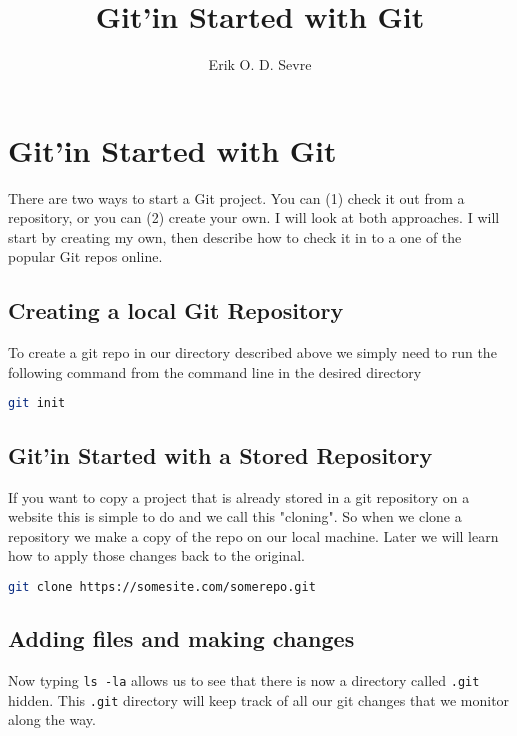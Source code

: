 \documentclass[a4paper]{spie} %
\author{Erik O. D. Sevre}
\title{Git'in Started with Git}
\begin{document}
\maketitle

\section*{Git'in Started with Git}

There are two ways to start a Git project. You can (1) check it out from a repository, or you can (2) create your own. I will look at both approaches. I will start by creating my own, then describe how to check it in to a one of the popular Git repos online.

\subsection*{Creating a local Git Repository}

To create a git repo in our directory described above we simply need to run the following command from the command line in the desired directory
\begin{lstlisting}[language=bash]
git init
\end{lstlisting}

\subsection*{Git'in Started with a Stored Repository}

If you want to copy a project that is already stored in a git repository on a website this is simple to do and we call this "cloning". So when we clone a repository we make a copy of the repo on our local machine. Later we will learn how to apply those changes back to the original.

\begin{lstlisting}[language=bash]
git clone https://somesite.com/somerepo.git
\end{lstlisting}


\subsection*{Adding files and making changes}

Now typing \texttt{ls -la} allows us to see that there is now a directory called \texttt{.git} hidden. This \texttt{.git} directory will keep track of all our git changes that we monitor along the way.
\end{document}
